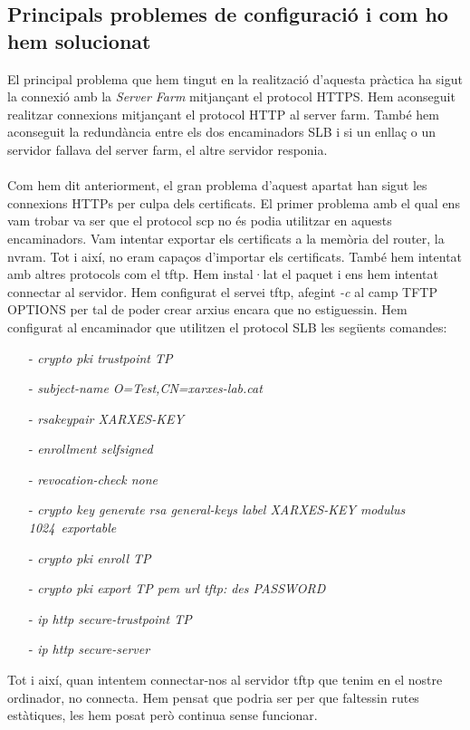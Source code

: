 \documentclass[10pt]{article}
\begin{document}
\subsection{Principals problemes de configuració i com ho hem solucionat}
El principal problema que hem tingut en la realització d'aquesta pràctica ha sigut la connexió amb la \textit{Server Farm} mitjançant el protocol HTTPS. Hem aconseguit realitzar connexions mitjançant el protocol HTTP al server farm. També hem aconseguit la redundància entre els dos encaminadors SLB i si un enllaç o un servidor fallava del server farm, el altre servidor responia. 
\\\\
Com hem dit anteriorment, el gran problema d'aquest apartat han sigut les connexions HTTPs per culpa dels certificats. El primer problema amb el qual ens vam trobar va ser que el protocol scp no és podia utilitzar en aquests encaminadors. Vam intentar exportar els certificats a la memòria del router, la nvram. Tot i així, no eram capaços d'importar els certificats. També hem intentat amb altres protocols com el tftp. Hem instal·lat el paquet i ens hem intentat connectar al servidor. Hem configurat el servei tftp, afegint \textit{-c} al camp TFTP\underline{ }OPTIONS per tal de poder crear arxius encara que no estiguessin. Hem configurat al encaminador que utilitzen el protocol SLB les següents comandes:
\begin{itemize}

\item[- ]\textit{crypto pki trustpoint TP}
\item[- ]\textit{subject-name O=Test,CN=xarxes-lab.cat}
\item[- ]\textit{rsakeypair XARXES-KEY}
\item[- ]\textit{enrollment selfsigned}
\item[- ]\textit{revocation-check none}
\item[- ]\textit{crypto key generate rsa general-keys label XARXES-KEY modulus 1024\ exportable}
\item[- ]\textit{crypto pki enroll TP}
\item[- ]\textit{crypto pki export TP pem url tftp: des PASSWORD }
\item[- ]\textit{ip http secure-trustpoint TP}
\item[- ]\textit{ip http secure-server}
\end{itemize}
Tot i així, quan intentem connectar-nos al servidor tftp que tenim en el nostre ordinador, no connecta. Hem pensat que podria ser per que faltessin rutes estàtiques, les hem posat però continua sense funcionar.
\end{document}
